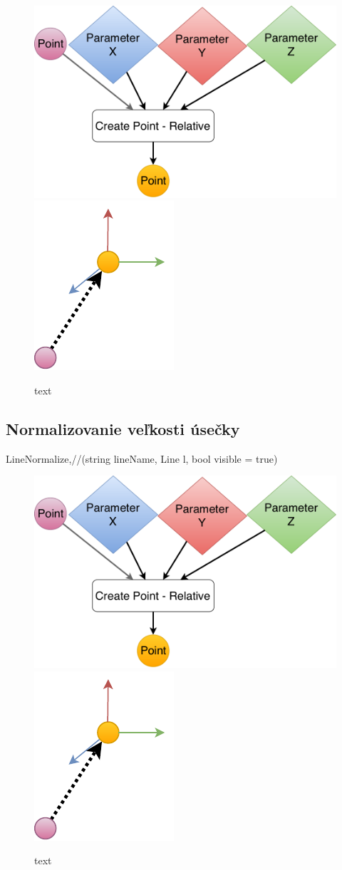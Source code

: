 \begin{figure}[H]
	\centering
	\includegraphics[height=0.3\textwidth]{obrazky-figures/Diagram/DP Navrh operacii-0D - Point2.pdf}
	\includegraphics[height=0.3\textwidth]{obrazky-figures/Diagram/Draw/1Points/DP Navrh operacii-0D - PointRelative.pdf}
	\caption{text}
	\label{fig:1}
\end{figure}

\subsection{Normalizovanie veľkosti úsečky}
		LineNormalize,//(string lineName, Line l, bool visible = true)

\begin{figure}[H]
	\centering
	\includegraphics[height=0.3\textwidth]{obrazky-figures/Diagram/DP Navrh operacii-0D - Point2.pdf}
	\includegraphics[height=0.3\textwidth]{obrazky-figures/Diagram/Draw/1Points/DP Navrh operacii-0D - PointRelative.pdf}
	\caption{text}
	\label{fig:1}
\end{figure}

